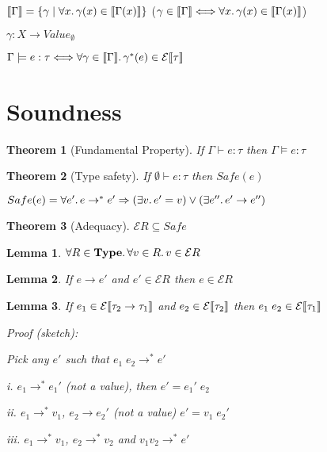 
$\llbracket\Gamma\rrbracket = \{\gamma \mid \forall x\ldotp \gamma(x) \in \llbracket\Gamma(x)\rrbracket\}$
($\gamma \in \llbracket\Gamma\rrbracket \Longleftrightarrow \forall x\ldotp \gamma(x) \in \llbracket\Gamma(x)\rrbracket $)

$\gamma \colon X \to Value_{\emptyset}$

$\Gamma \models e : \tau \Longleftrightarrow \forall \gamma \in \llbracket\Gamma\rrbracket\ldotp \gamma^*(e) \in \mathcal{E}\llbracket\tau\rrbracket$

\section{Soundness}

\newtheorem*{theorem}{Theorem}

\begin{theorem}[Fundamental Property]
  If $\Gamma \vdash e : \tau$ then $\Gamma \models e : \tau$
\end{theorem}

\begin{theorem}[Type safety]
  If $\emptyset \vdash e : \tau$ then $Safe(e)$

  $Safe(e) = \forall e'\ldotp e\to^*e' \Rightarrow (\exists v\ldotp e'=v) \lor (\exists e''\ldotp e'\to e'')$
\end{theorem}

\begin{theorem}[Adequacy]
  $\mathcal{E}R \subseteq Safe$
\end{theorem}

\newtheorem{lemma}{Lemma}

\begin{lemma}
  $\forall R \in \textbf{Type}\ldotp \forall v \in R\ldotp v \in \mathcal{E}R$
\end{lemma}

\begin{lemma}
  If $e \to e'$ and $e' \in \mathcal{E}R$ then $e \in \mathcal{E}R$
\end{lemma}

\begin{lemma}
  If $e_1 \in \mathcal{E}\llbracket\tau_2 \to \tau_1\rrbracket$ and $e_2 \in \mathcal{E}\llbracket\tau_2\rrbracket$ then $e_1\;e_2 \in \mathcal{E}\llbracket\tau_1\rrbracket$

  Proof (sketch):

  Pick any $e'$ such that $e_1\;e_2 \to^* e'$

  i. $e_1 \to^* e_1'$ (not a value), then $e' = e_1'\;e_2$

  ii. $e_1 \to^* v_1$, $e_2\to e_2'$ (not a value) $e' = v_1\;e_2'$

  iii. $e_1 \to^* v_1$, $e_2 \to^* v_2$ and $v_1 v_2 \to^* e'$
\end{lemma}

